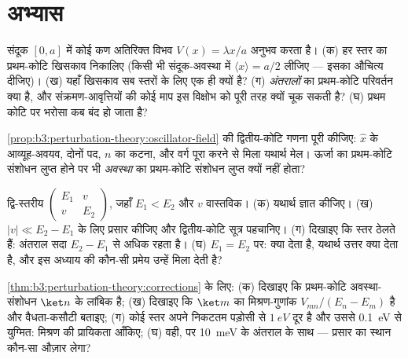 \section{अभ्यास}

\begin{exercise}[$\star$]\label{exo:b3:perturbation-theory:1}
संदूक $[0, a]$ में कोई कण अतिरिक्त विभव $V(x) =
\lambda x/a$ अनुभव करता है। (क) हर स्तर का प्रथम-कोटि खिसकाव निकालिए
(किसी भी संदूक-अवस्था में $\langle x\rangle = a/2$ लीजिए --- इसका औचित्य दीजिए)।
(ख) यहाँ खिसकाव सब स्तरों के लिए एक ही क्यों है? (ग)
\emph{अंतरालों} का प्रथम-कोटि परिवर्तन क्या है, और
संक्रमण-आवृत्तियों की कोई माप इस विक्षोभ को पूरी तरह क्यों चूक सकती
है? (घ) प्रथम कोटि पर भरोसा कब बंद हो जाता है?
\end{exercise}

\begin{exercise}[$\star$]\label{exo:b3:perturbation-theory:2}
\cref{prop:b3:perturbation-theory:oscillator-field} की द्वितीय-कोटि
गणना पूरी कीजिए: $\hat x$ के आव्यूह-अवयव, दोनों पद, $n$ का कटना, और
वर्ग पूरा करने से मिला यथार्थ मेल। ऊर्जा का प्रथम-कोटि संशोधन लुप्त
होने पर भी \emph{अवस्था} का प्रथम-कोटि संशोधन लुप्त क्यों नहीं होता?
\end{exercise}

\begin{exercise}[$\star$]\label{exo:b3:perturbation-theory:3}
द्वि-स्तरीय  $\begin{pmatrix}E_1 & v\\ v &
E_2\end{pmatrix}$, जहाँ $E_1 < E_2$ और $v$ वास्तविक। (क) यथार्थ
 ज्ञात कीजिए। (ख) $|v| \ll E_2 - E_1$ के लिए प्रसार कीजिए और
द्वितीय-कोटि सूत्र पहचानिए। (ग) दिखाइए कि स्तर ठेलते हैं: अंतराल सदा
$E_2 - E_1$ से अधिक रहता है। (घ) $E_1 = E_2$ पर: 
क्या देता है, यथार्थ उत्तर क्या देता है, और इस अध्याय की कौन-सी प्रमेय
उन्हें मिला देती है?
\end{exercise}

\begin{exercise}[$\star$]\label{exo:b3:perturbation-theory:4}
\cref{thm:b3:perturbation-theory:corrections} के लिए: (क) दिखाइए कि
प्रथम-कोटि अवस्था-संशोधन $\ket n$ के लांबिक है; (ख) दिखाइए कि
$\ket m$ का मिश्रण-गुणांक $V_{mn}/(E_n - E_m)$ है और
वैधता-कसौटी बताइए; (ग) कोई स्तर अपने निकटतम पड़ोसी से
$\qty{1}{eV}$ दूर है और उससे \qty{0.1}{eV} से युग्मित: मिश्रण की
प्रायिकता आँकिए; (घ) वही, पर \qty{10}{meV} के अंतराल के साथ ---
प्रसार का स्थान कौन-सा औज़ार लेगा?
\end{exercise}

